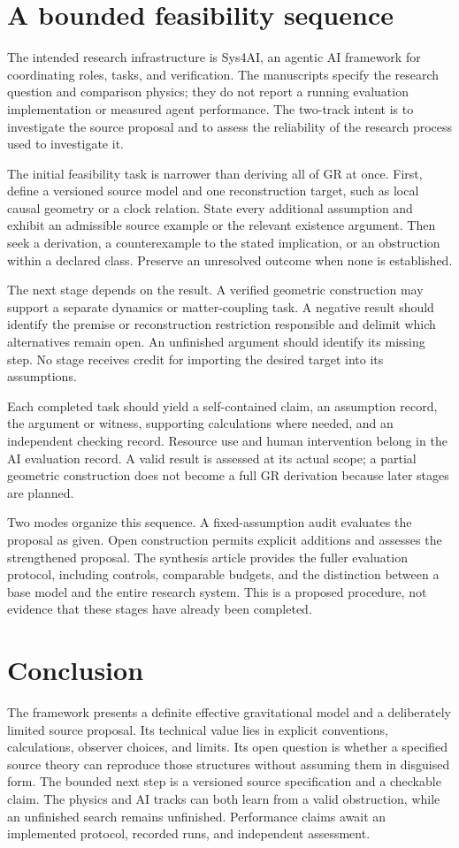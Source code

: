 \documentclass[11pt,oneside]{report}
\theoremstyle{remark}
\numberwithin{definition}{chapter}
\numberwithin{proposition}{chapter}
\numberwithin{remark}{chapter}
\begin{document}
\section{A bounded feasibility sequence}
The intended research infrastructure is Sys4AI, an agentic AI framework for coordinating roles, tasks, and verification. The manuscripts specify the research question and comparison physics; they do not report a running evaluation implementation or measured agent performance. The two-track intent is to investigate the source proposal and to assess the reliability of the research process used to investigate it.

The initial feasibility task is narrower than deriving all of GR at once. First, define a versioned source model and one reconstruction target, such as local causal geometry or a clock relation. State every additional assumption and exhibit an admissible source example or the relevant existence argument. Then seek a derivation, a counterexample to the stated implication, or an obstruction within a declared class. Preserve an unresolved outcome when none is established.

The next stage depends on the result. A verified geometric construction may support a separate dynamics or matter-coupling task. A negative result should identify the premise or reconstruction restriction responsible and delimit which alternatives remain open. An unfinished argument should identify its missing step. No stage receives credit for importing the desired target into its assumptions.

Each completed task should yield a self-contained claim, an assumption record, the argument or witness, supporting calculations where needed, and an independent checking record. Resource use and human intervention belong in the AI evaluation record. A valid result is assessed at its actual scope; a partial geometric construction does not become a full GR derivation because later stages are planned.

Two modes organize this sequence. A fixed-assumption audit evaluates the proposal as given. Open construction permits explicit additions and assesses the strengthened proposal. The synthesis article provides the fuller evaluation protocol, including controls, comparable budgets, and the distinction between a base model and the entire research system. This is a proposed procedure, not evidence that these stages have already been completed.

\section{Conclusion}
The framework presents a definite effective gravitational model and a deliberately limited source proposal. Its technical value lies in explicit conventions, calculations, observer choices, and limits. Its open question is whether a specified source theory can reproduce those structures without assuming them in disguised form.
The bounded next step is a versioned source specification and a checkable claim. The physics and AI tracks can both learn from a valid obstruction, while an unfinished search remains unfinished. Performance claims await an implemented protocol, recorded runs, and independent assessment.
\end{document}
